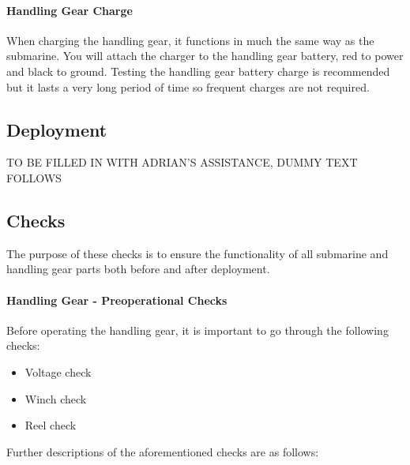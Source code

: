 \documentclass[
10pt, %
a4paper, %
oneside, %
headinclude,footinclude, %
BCOR5mm, %
]{scrartcl}
\begin{document}
\paragraph{Handling Gear Charge}
When charging the handling gear, it functions in much the same way as the submarine. You will attach the charger to the handling gear battery, red to power and black to ground. Testing the handling gear battery charge is recommended but it lasts a very long period of time so frequent charges are not required.


\subsection{Deployment}

TO BE FILLED IN WITH ADRIAN'S ASSISTANCE, DUMMY TEXT FOLLOWS

\lipsum[6]



\subsection{Checks}

The purpose of these checks is to ensure the functionality of all submarine and handling gear parts both before and after deployment.

\paragraph{Handling Gear - Preoperational Checks} Before operating the handling gear, it is important to go through the following checks:

\begin{itemize}[noitemsep] %
	\item Voltage check
	\item Winch check
	\item Reel check
	
\end{itemize}
Further descriptions of the aforementioned checks are as follows:
\end{document}
